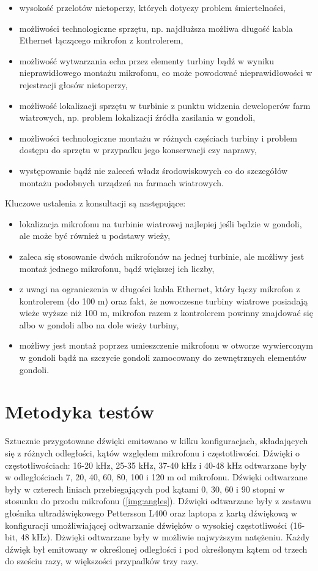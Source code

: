 \documentclass{sprz}
\begin{document}
\begin{itemize}
  \item{wysokość przelotów nietoperzy, których dotyczy problem śmiertelności,}
  \item{możliwości technologiczne sprzętu, np. najdłuższa możliwa długość kabla Ethernet łączącego mikrofon z kontrolerem,}
  \item{możliwość wytwarzania echa przez elementy turbiny bądź w wyniku nieprawidłowego montażu mikrofonu, co może powodować nieprawidłowości w rejestracji głosów nietoperzy,}
  \item{możliwość lokalizacji sprzętu w turbinie z punktu widzenia deweloperów farm wiatrowych, np. problem lokalizacji źródła zasilania w gondoli,}
  \item {możliwości technologiczne montażu w różnych częściach turbiny i problem dostępu do sprzętu w przypadku jego konserwacji czy naprawy,}
  \item {występowanie bądź nie zaleceń władz środowiskowych co do szczegółów montażu podobnych urządzeń na farmach wiatrowych.}
\end{itemize}

Kluczowe ustalenia z konsultacji są następujące:
\begin{itemize}
  \item{lokalizacja mikrofonu na turbinie wiatrowej najlepiej jeśli będzie w gondoli, ale może być również u podstawy wieży,}
  \item{zaleca się stosowanie dwóch mikrofonów na jednej turbinie, ale możliwy jest montaż jednego mikrofonu, bądź większej ich liczby,}
  \item{z uwagi na ograniczenia w długości kabla Ethernet, który łączy mikrofon z kontrolerem (do 100 m) oraz fakt, że nowoczesne turbiny wiatrowe posiadają wieże wyższe niż 100 m, mikrofon razem z kontrolerem powinny znajdować się albo w gondoli albo na dole wieży turbiny,}
  \item{możliwy jest montaż poprzez umieszczenie mikrofonu w otworze wywierconym w gondoli bądź na szczycie gondoli zamocowany do zewnętrznych elementów gondoli.}
\end{itemize}

\section{Metodyka testów}
Sztucznie przygotowane dźwięki emitowano w kilku konfiguracjach, składających się z różnych odległości, kątów względem mikrofonu i częstotliwości. Dźwięki o częstotliwościach: 16-20 kHz, 25-35 kHz, 37-40 kHz i 40-48 kHz odtwarzane były w odległościach 7, 20, 40, 60, 80, 100 i 120 m od mikrofonu. Dźwięki odtwarzane były w czterech liniach przebiegających pod kątami 0, 30, 60 i 90 stopni w stosunku do przodu mikrofonu (\ref{img:angles}). Dźwięki odtwarzane były z zestawu głośnika ultradźwiękowego Pettersson L400 oraz laptopa z kartą dźwiękową w konfiguracji umożliwiającej odtwarzanie dźwięków o wysokiej częstotliwości (16-bit, 48 kHz). Dżwięki odtwarzane były w możliwie najwyższym natężeniu. Każdy dźwięk był emitowany w określonej odległości i pod określonym kątem od trzech do sześciu razy, w większości przypadków trzy razy.
\end{document}
